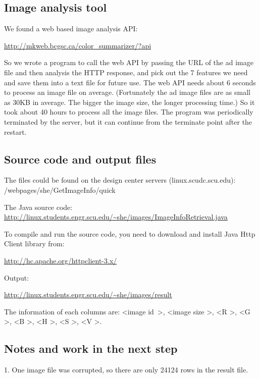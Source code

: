 \documentclass{article} %
\begin{document}
\subsection{Image analysis tool}
We found a web based image analysis API:
\begin{center}
   \url{http://mkweb.bcgsc.ca/color_summarizer/?api}
\end{center}
So we wrote a program to call the web API by passing the URL of the ad image file and then analysis the HTTP response, and pick out the 7 features we need and save them into a text file for future use.
The web API needs about 6 seconds to process an image file on average. (Fortunately the ad image files are as small as 30KB in average. The bigger the image size, the longer processing time.) So it took about 40 hours to process all the image files. The program was periodically terminated by the server, but it can continue from the terminate point after the restart.

\subsection{Source code and output files}
The files could be found on the design center servers (linux.scudc.scu.edu): /webpages/she/GetImageInfo/quick

The Java source code:  \url{http://linux.students.engr.scu.edu/~she/images/ImageInfoRetrieval.java}

To compile and run the source code, you need to download and install Java Http Client library from:
\begin{center}
   \url{http://hc.apache.org/httpclient-3.x/}
\end{center}

Output:
\begin{center}
   \url{http://linux.students.engr.scu.edu/~she/images/result}
\end{center}
The information of each columns are: \textless image id\ \textgreater, \textless image size \textgreater, \textless R \textgreater, \textless G \textgreater, \textless B \textgreater, \textless H \textgreater, \textless S \textgreater, \textless V \textgreater.

\subsection{Notes and work in the next step}
1. One image file was corrupted, so there are only 24124 rows in the result file.
\end{document}
